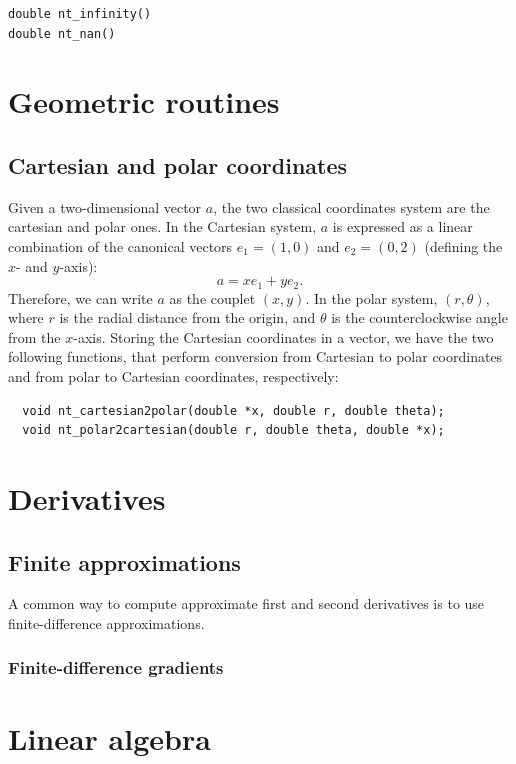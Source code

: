 \begin{verbatim}
double nt_infinity()
double nt_nan()
\end{verbatim}

\section{Geometric routines}

\subsection{Cartesian and polar coordinates}

Given a two-dimensional vector $a$, the two classical coordinates system are the cartesian and polar ones.
In the Cartesian system, $a$ is expressed as a linear combination of the canonical vectors $e_1 = (1,0)$ and $e_2=(0,2)$ (defining the $x$- and $y$-axis):
\[
a = x e_1 + y e_2.
\]
Therefore, we can write $a$ as the couplet $(x, y)$.
In the polar system, $(r, \theta)$, where $r$ is the radial distance from the origin, and $\theta$ is the counterclockwise angle from the $x$-axis.
Storing the Cartesian coordinates in a vector, we have the two following functions, that perform conversion from Cartesian to polar coordinates and from polar to Cartesian coordinates, respectively:
\begin{verbatim}
  void nt_cartesian2polar(double *x, double r, double theta);
  void nt_polar2cartesian(double r, double theta, double *x);
\end{verbatim}

\section{Derivatives}

\subsection{Finite approximations}

A common way to compute approximate first and second derivatives is to use finite-difference
approximations.

\subsubsection{Finite-difference gradients}

\section{Linear algebra}

